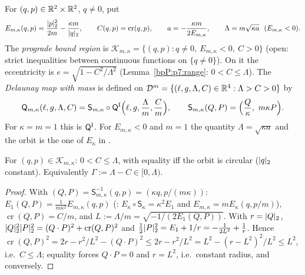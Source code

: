 \begin{definition}\label{bpP:p7:kepler-data}
For $(q,p)\in\mathbb{R}^2\times\mathbb{R}^2$, $q\ne0$, put
\[E_{m,\kappa}(q,p)=\frac{\pl p^2}{2m}-\frac{\kappa m}{\pl q},\qquad C(q,p)=\operatorname{cr}(q,p),\qquad a=-\frac{\kappa m}{2E_{m,\kappa}},\qquad\Lambda=m\sqrt{\kappa a}\ \ (E_{m,\kappa}<0).\]
The \emph{prograde bound region} is $\mathcal K_{m,\kappa}=\{(q,p):q\ne0,\ E_{m,\kappa}<0,\ C>0\}$ (open: strict inequalities between continuous functions on $\{q\ne0\}$). On it the eccentricity is $e=\sqrt{1-C^2/\Lambda^2}$
(Lemma~\ref{bpP:p7:range}: $0<C\le\Lambda$). The \emph{Delaunay map with mass} is defined on $\mathcal D^m=\{(\ell,g,\Lambda,C)\in\mathbb{R}^4:\Lambda>C>0\}$ by
\[\mathsf Q_{m,\kappa}(\ell,g,\Lambda,C)=\mathsf S_{m,\kappa}\circ\mathsf Q^{\rm I}\Bigl(\ell,g,\frac\Lambda m,\frac Cm\Bigr),\qquad\mathsf S_{m,\kappa}(Q,P)=\Bigl(\frac Q\kappa,\ m\kappa P\Bigr).\]
For $\kappa=m=1$ this is $\mathsf Q^{\rm I}$. For $E_{m,\kappa}<0$ and $m=1$ the quantity $\Lambda=\sqrt{\kappa a}$ and the orbit is the one of $E_\kappa$ in .
\end{definition}

\begin{lemma}\label{bpP:p7:range}
For $(q,p)\in\mathcal K_{m,\kappa}$: $0<C\le\Lambda$, with equality iff the orbit is circular ($\lvert q\rvert_2$ constant). Equivalently $\Gamma:=\Lambda-C\in[0,\Lambda)$.
\end{lemma}
\begin{proof}
\label{stepP:p7:rg-scale} With $(Q,P)=\mathsf S_{m,\kappa}^{-1}(q,p)=(\kappa q,p/(m\kappa))$: $E_1(Q,P)=\frac1{m\kappa^2}E_{m,\kappa}(q,p)$ (: $E_\kappa\circ\mathsf S_\kappa=\kappa^2E_1$ and $E_{m,\kappa}=mE_\kappa(q,p/m)$), $\operatorname{cr}(Q,P)=C/m$, and $L:=\Lambda/m=\sqrt{-1/(2E_1(Q,P))}$.
\label{stepP:p7:rg-lagrange} With $r=\lvert Q\rvert_2$, $\lvert Q\rvert_2^2\lvert P\rvert_2^2=(Q\cdot P)^2+\operatorname{cr}(Q,P)^2$ and $\frac12\lvert P\rvert_2^2=E_1+1/r=-\frac1{2L^2}+\frac1r$. Hence
$\operatorname{cr}(Q,P)^2=2r-r^2/L^2-(Q\cdot P)^2\le2r-r^2/L^2=L^2-(r-L^2)^2/L^2\le L^2$, i.e.\ $C\le\Lambda$; equality forces $Q\cdot P=0$ and $r=L^2$, i.e.\ constant radius, and conversely.
\end{proof}

